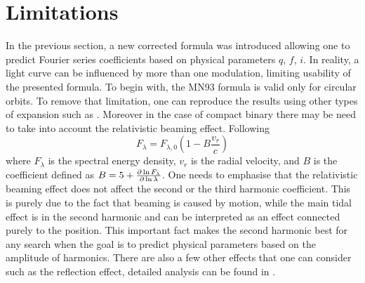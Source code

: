 \documentclass{pracalicmgr}
\begin{document}
\section{Limitations}
In the previous section, a new corrected formula was introduced allowing one to predict Fourier series coefficients based on physical parameters $q$, $f$, $i$.
In reality, a light curve can be influenced by more than one modulation,
limiting usability of the presented formula. To begin with, the MN93 formula is valid only for circular orbits. 
To remove that limitation, one can reproduce the results using other types of expansion such as \citet{engel_beer_2020}. Moreover in the case of compact
binary there may be need to take into account the relativistic beaming effect. Following \citet{loeb_periodic_2003} 
\begin{equation}
    F_{\lambda}=F_{\lambda,0}\left(1-B\frac{v_r}{c}\right)
\end{equation}
where $F_\lambda$ is the spectral energy density, $v_r$ is the radial velocity, and $B$ is the coefficient defined as $B=5+\pdv{\ln{F_\lambda}}{\ln{\lambda}}$.
One needs to emphasise that the relativistic beaming effect does not affect the second or the third harmonic coefficient. This is purely due to the fact that beaming is caused by motion, while the
main tidal effect is in the second harmonic and can be interpreted as an effect connected purely to the position. This important fact makes the second harmonic best for any search when
the goal is to predict physical parameters based on the amplitude of harmonics. There are also a few other effects that one can consider such as the reflection effect,
detailed analysis can be found in \citet{gomel_search_2021-1}.
\end{document}
